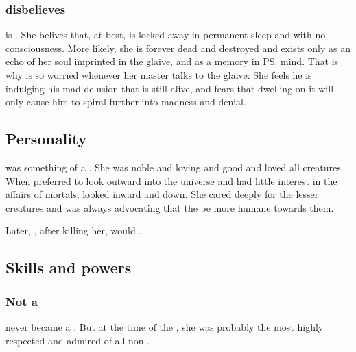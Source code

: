\subsubsection{\Criseis{} disbelieves}
\Criseis{} is \skeptical. 
She belives that, at best, \Triestessakhin{} is locked away in permanent sleep and with no consciousness. 
More likely, she is forever dead and destroyed and exists only as an echo of her soul imprinted in the glaive, and as a memory in \ps{\Ishnaruchaefir} mind. 
That is why \Criseis{} is so worried whenever her master talks to the glaive: 
She feels he is indulging his mad delusion that \Triestessakhin{} is still alive, and fears that dwelling on it will only cause him to spiral further into madness and denial. 









\subsection{Personality}
\Rystessakhin was something of a .
She was noble and loving and good and loved all creatures.
When \Ishnaruchaefir preferred to look outward into the universe and had little interest in the affairs of mortals, \Rystessakhin looked inward and down. 
She cared deeply for the lesser creatures and was always advocating that the \dragons be more humane towards them.

Later, \Ishnaruchaefir, after killing her, would . 









\subsection{Skills and powers}





\subsubsection{Not a \shaeeroth}
\Rystessakhin never became a \shaeeroth. 
But at the time of the \secondbanewar, she was probably the most highly respected and admired of all non-\shaeeroth \dragons. 















